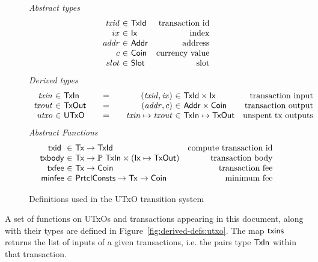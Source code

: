\documentclass[11pt,a4paper]{article}
\newcommand{\Tx}{\type{Tx}}
\newcommand{\Ix}{\type{Ix}}
\newcommand{\TxId}{\type{TxId}}
\newcommand{\Addr}{\type{Addr}}
\newcommand{\UTxO}{\type{UTxO}}
\newcommand{\Coin}{\type{Coin}}
\newcommand{\PrtclConsts}{\type{PrtclConsts}}
\newcommand{\Slot}{\type{Slot}}
\newcommand{\TxIn}{\type{TxIn}}
\newcommand{\TxOut}{\type{TxOut}}
\newcommand{\txid}[1]{\fun{txid}~ \var{#1}}
\theoremstyle{definition}
\theoremstyle{definition}
\begin{document}
\begin{figure*}
  \emph{Abstract types}
  \begin{equation*}
    \begin{array}{r@{~\in~}lr}
      \var{txid} & \TxId & \text{transaction id}\\
      ix & \Ix & \text{index}\\
      \var{addr} & \Addr & \text{address}\\
      c & \Coin & \text{currency value}\\
      slot & \Slot & \text{slot}
    \end{array}
  \end{equation*}
  \emph{Derived types}
  \begin{equation*}
    \begin{array}{r@{~\in~}l@{\qquad=\qquad}r@{~\in~}lr}
      \var{txin}
      & \TxIn
      & (\var{txid}, \var{ix})
      & \TxId \times \Ix
      & \text{transaction input}
      \\
      \var{txout}
      & \type{TxOut}
      & (\var{addr}, c)
      & \Addr \times \Coin
      & \text{transaction output}
      \\
      \var{utxo}
      & \UTxO
      & \var{txin} \mapsto \var{txout}
      & \TxIn \mapsto \TxOut
      & \text{unspent tx outputs}
    \end{array}
  \end{equation*}
  \emph{Abstract Functions}
  \begin{equation*}
    \begin{array}{r@{~\in~}lr}
      \txid{} & \Tx \to \TxId & \text{compute transaction id}\\
      \fun{txbody} & \Tx \to \powerset{\TxIn} \times (\Ix \mapsto \TxOut)
                                  & \text{transaction body}\\
      \fun{txfee} & \Tx \to \Coin & \text{transaction fee}\\
      \fun{minfee} & \PrtclConsts \to \Tx \to \Coin & \text{minimum fee}
    \end{array}
  \end{equation*}
  \caption{Definitions used in the UTxO transition system}
  \label{fig:defs:utxo}
\end{figure*}


A set of functions on UTxOs and transactions appearing in this document,
along with their types are defined in Figure~\ref{fig:derived-defs:utxo}.
The map $\mathsf{txins}$ returns the list of inputs of a given transactions, i.e.
the pairs type $\TxIn$ within that transaction.
\end{document}
